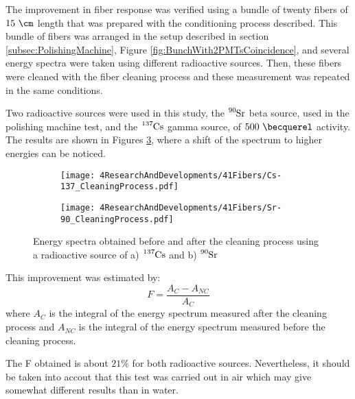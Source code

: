 The improvement in fiber response was verified using a bundle of twenty fibers of $15~\cm$ length  that was prepared with the conditioning process described. This bundle of fibers was arranged in the setup described in section \ref{subsec:PolishingMachine}, Figure \ref{fig:BunchWith2PMTsCoincidence}, and several energy spectra were taken using different radioactive sources. Then, these fibers were cleaned with the fiber cleaning process and these measurement was repeated in the same conditions.

Two radioactive sources were used in this study, the $\ce{^{90}Sr}$ beta source, used in the polishing machine test, and the $\ce{^{137}Cs}$ gamma source, of $500~\becquerel$ activity. The results are shown in Figures \ref{fig:ResultsOfCleaningProcess}, where a shift of the spectrum to higher energies can be noticed. 

\begin{figure}
\centering
    \begin{subfigure}[b]{0.76\textwidth}
    \centering
    \texttt{[image: 4ResearchAndDevelopments/41Fibers/Cs-137\_CleaningProcess.pdf]}  
    \caption{\label{subfig:EnergySpectrumCo60CleaningTest}}
    \end{subfigure}
    \hfill
    \begin{subfigure}[b]{0.76\textwidth}
    \centering
    \texttt{[image: 4ResearchAndDevelopments/41Fibers/Sr-90\_CleaningProcess.pdf]}  
    \caption{\label{subfig:EnergySpectrumSr90CleaningTest}}
    \end{subfigure}
 \caption{Energy spectra obtained before and after the cleaning process using a radioactive source of a) $\ce{^{137}Cs}$ and b) $\ce{^{90}Sr}$}
 \label{fig:ResultsOfCleaningProcess}
\end{figure}

This improvement was estimated by: 
\begin{equation}
F=\frac{A_{C}-A_{NC}}{A_{C}}
\label{eq:RelativeImprovement}
\end{equation}
where $A_{C}$ is the integral of the energy spectrum measured after the cleaning process and $A_{NC}$ is the integral of the energy spectrum measured before the cleaning process.

The F obtained is about $21\%$ for both radioactive sources. Nevertheless, it should be taken into accout that this test was carried out in air which may give somewhat different results than in water.

